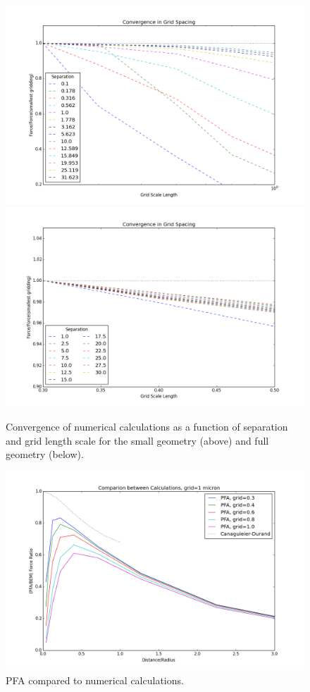\documentclass[11pt,traditabstract]{article}
\begin{document}
\begin{figure}[h]
\centering
\includegraphics[width=5.5in]{pfa_convergence}
\includegraphics[width=5.5in]{pfa_convergence_zoom_best}
\caption{Convergence of numerical calculations as a function of separation and grid length scale for the small geometry (above) and full geometry (below).}\label{fig:conv2}
\end{figure}

\begin{figure}[h]
\centering
\includegraphics[width=7in]{pfa_v_pec}
\caption{PFA compared to numerical calculations.}\label{fig:geometric}
\end{figure}
\end{document}
